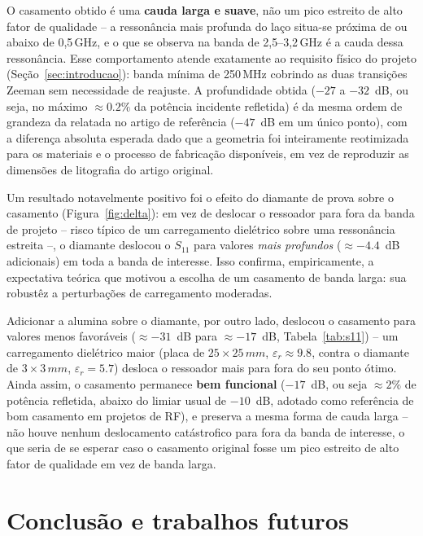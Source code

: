 \documentclass[10pt,a4paper,twocolumn]{article}
\begin{document}
O casamento obtido \'e uma \textbf{cauda larga e suave}, n\~ao um pico
estreito de alto fator de qualidade -- a resson\^ancia mais profunda do
la\c{c}o situa-se pr\'oxima de ou abaixo de 0,5\,GHz, e o
que se observa na banda de 2,5--3,2\,GHz \'e a cauda
dessa resson\^ancia. Esse comportamento atende exatamente ao requisito
f\'isico do projeto (Se\c{c}\~ao~\ref{sec:introducao}): banda m\'inima
de 250\,MHz cobrindo as duas transi\c{c}\~oes Zeeman sem necessidade de reajuste. A profundidade obtida ($-27$ a $-32$~dB, ou seja, no m\'aximo
$\approx0.2\%$ da pot\^encia incidente refletida) \'e da mesma ordem de
grandeza da relatada no artigo de refer\^encia ($-47$~dB em um \'unico
ponto), com a diferen\c{c}a absoluta esperada dado que a geometria foi
inteiramente reotimizada para os materiais e o processo de fabrica\c{c}\~ao
dispon\'iveis, em vez de reproduzir as dimens\~oes de litografia do
artigo original.

Um resultado notavelmente positivo foi o efeito do diamante de prova
sobre o casamento (Figura~\ref{fig:delta}): em vez de deslocar o
ressoador para fora da banda de projeto -- risco t\'ipico de um
carregamento diel\'etrico sobre uma resson\^ancia estreita --, o
diamante deslocou o $S_{11}$ para valores \emph{mais profundos}
($\approx-4.4$~dB adicionais) em toda a banda de interesse. Isso
confirma, empiricamente, a expectativa te\'orica que motivou a escolha
de um casamento de banda larga: sua robust\^ez a perturba\c{c}\~oes de
carregamento moderadas.

Adicionar a alumina sobre o diamante, por outro lado, deslocou o
casamento para valores menos favor\'aveis ($\approx-31$~dB para $\approx-17$~dB,
Tabela~\ref{tab:s11}) -- um carregamento diel\'etrico maior (placa de
$25\times25\,mm$, $\varepsilon_r\approx9.8$, contra o
diamante de $3\times3\,mm$, $\varepsilon_r=5.7$) desloca o
ressoador mais para fora do seu ponto \'otimo. Ainda assim, o
casamento permanece \textbf{bem funcional} ($-17$~dB, ou seja
$\approx2\%$ de pot\^encia refletida, abaixo do limiar usual de
$-10$~dB, adotado como refer\^encia de bom casamento em projetos de
RF), e preserva a mesma forma de cauda larga -- n\~ao houve nenhum
deslocamento cat\'astrofico para fora da banda de interesse, o que
seria de se esperar caso o casamento original fosse um pico estreito
de alto fator de qualidade em vez de banda larga.

\section{Conclus\~ao e trabalhos futuros}
\label{sec:trabalhos-futuros}
\end{document}
